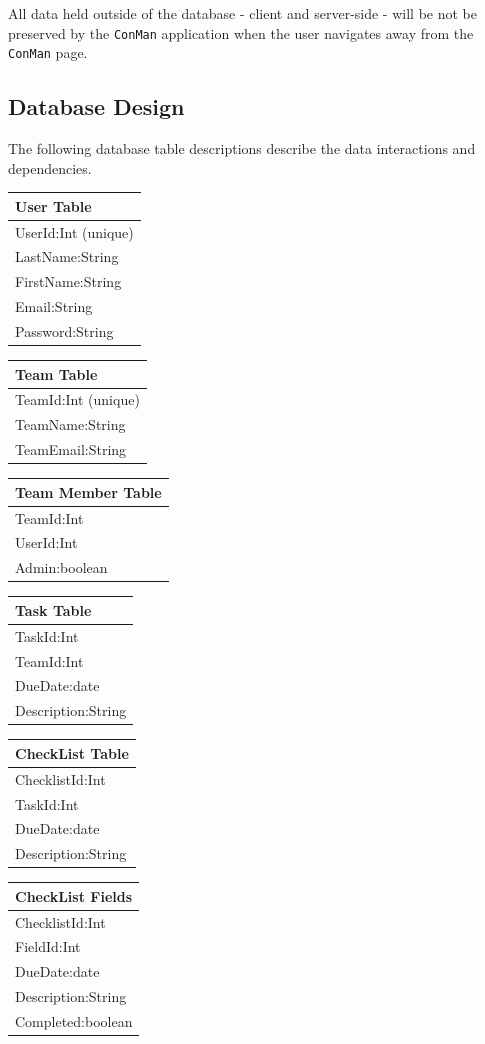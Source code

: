 \documentclass{article}
\begin{document}
All data held outside of the database - client and server-side -  will be not be preserved by the \texttt{ConMan} application when the user navigates away from the \texttt{ConMan} page.

\subsection{Database Design}
The following database table descriptions describe the data interactions and dependencies.

\begin{tabular}{|l|} \hline
    \textbf{User Table} \\ \hline
    UserId:Int (unique)\\
    LastName:String\\
    FirstName:String\\
    Email:String\\
    Password:String\\ \hline
\end{tabular}
\hfill
\begin{tabular}{|l|} \hline
    \textbf{Team Table} \\ \hline
    TeamId:Int (unique)\\
    TeamName:String \\
    TeamEmail:String\\ \hline
\end{tabular}

\begin{tabular}{|l|} \hline
    \textbf{Team Member Table} \\ \hline
    TeamId:Int\\
    UserId:Int\\
    Admin:boolean\\ \hline
\end{tabular}
\hfill
\begin{tabular}{|l|} \hline
    \textbf{Task Table} \\ \hline
    TaskId:Int\\
    TeamId:Int\\
    DueDate:date\\
    Description:String\\ \hline
\end{tabular}

\begin{tabular}{|l|} \hline
    \textbf{CheckList Table} \\ \hline
    ChecklistId:Int\\
    TaskId:Int\\
    DueDate:date\\
    Description:String\\ \hline
\end{tabular}
\hfill
\begin{tabular}{|l|} \hline
    \textbf{CheckList Fields} \\ \hline
    ChecklistId:Int\\
    FieldId:Int\\
    DueDate:date\\
    Description:String\\
    Completed:boolean\\ \hline
\end{tabular}
\end{document}
